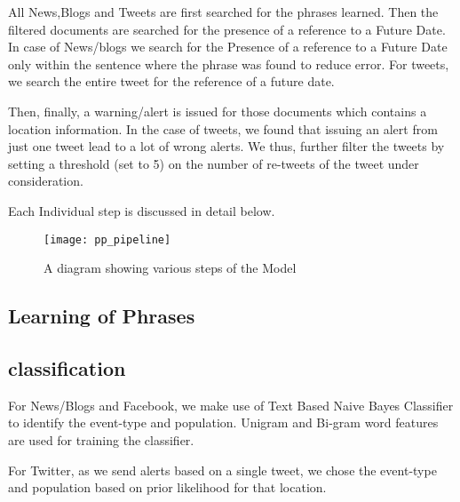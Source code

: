 
All News,Blogs and Tweets are first searched for the phrases learned. Then the filtered documents are searched for the presence of a reference to a Future Date. In case of News/blogs we search for the Presence of a reference to a Future Date only within the sentence where the phrase was found to reduce error. For tweets, we search the entire tweet for the reference of a future date.

Then, finally, a warning/alert is issued for those documents which contains a location information. In the case of tweets, we found that issuing an alert from just one tweet lead to a lot of wrong alerts. We thus, further filter the tweets by setting a threshold (set to 5) on the number of re-tweets of the tweet under consideration.

Each Individual step is discussed in detail below.

\begin{figure*}
\texttt{[image: pp\_pipeline]}
\caption{A diagram showing various steps of the Model}
\end{figure*}

\subsection{Learning of Phrases}



\subsection{classification}
For News/Blogs and Facebook, we make use of Text Based Naive Bayes Classifier to identify the event-type and population. Unigram and Bi-gram word features are used for training the classifier.

For Twitter, as we send alerts based on a single tweet, we chose the event-type and population based on prior likelihood for that location.

